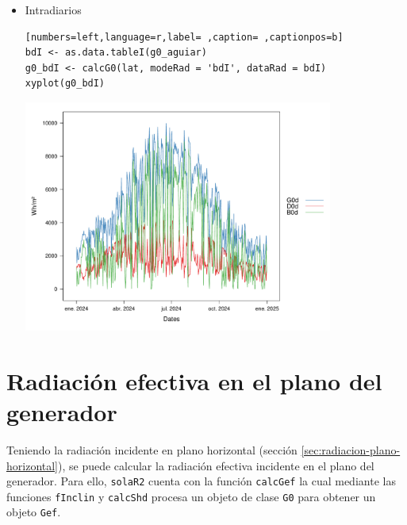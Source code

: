 \begin{itemize}
\item Intradiarios
\begin{lstlisting}[numbers=left,language=r,label= ,caption= ,captionpos=b]
bdI <- as.data.tableI(g0_aguiar)
g0_bdI <- calcG0(lat, modeRad = 'bdI', dataRad = bdI)
xyplot(g0_bdI)
\end{lstlisting}

\begin{center}
\includegraphics[width=0.8\textwidth]{figuras/codigo-calcg0.pdf}
\end{center}
\end{itemize}

\section{Radiación efectiva en el plano del generador}
\label{sec:orgad7a6c4}
\label{sec:radiacion-efectiva-plano-generador}
Teniendo la radiación incidente en plano horizontal (sección \ref{sec:radiacion-plano-horizontal}), se puede calcular la radiación efectiva incidente en el plano del generador. Para ello, \texttt{solaR2} cuenta con la función \texttt{calcGef} la cual mediante las funciones \texttt{fInclin} y \texttt{calcShd} procesa un objeto de clase \texttt{G0} para obtener un objeto \texttt{Gef}.

